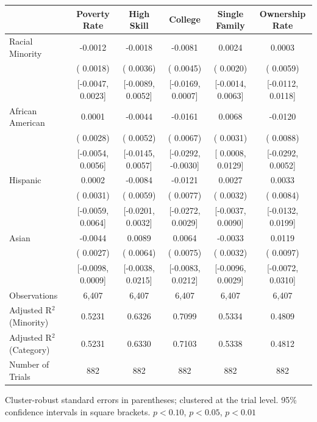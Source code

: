 \begin{table}[!htbp]
{\begin{tabular}{lccccc}
& Poverty Rate & High Skill & College & Single Family & Ownership Rate \\
\midrule
Racial Minority & -0.0012 & -0.0018 & -0.0081\sym{*} &  0.0024 &  0.0003  \\
 & ( 0.0018) & ( 0.0036) & ( 0.0045) & ( 0.0020) & ( 0.0059)  \\
 & [-0.0047,  0.0023] & [-0.0089,  0.0052] & [-0.0169,  0.0007] & [-0.0014,  0.0063] & [-0.0112,  0.0118]  \\
African American &  0.0001 & -0.0044 & -0.0161\sym{**} &  0.0068\sym{**} & -0.0120  \\
 & ( 0.0028) & ( 0.0052) & ( 0.0067) & ( 0.0031) & ( 0.0088)  \\
 & [-0.0054,  0.0056] & [-0.0145,  0.0057] & [-0.0292, -0.0030] & [ 0.0008,  0.0129] & [-0.0292,  0.0052]  \\
Hispanic &  0.0002 & -0.0084 & -0.0121 &  0.0027 &  0.0033  \\
 & ( 0.0031) & ( 0.0059) & ( 0.0077) & ( 0.0032) & ( 0.0084)  \\
 & [-0.0059,  0.0064] & [-0.0201,  0.0032] & [-0.0272,  0.0029] & [-0.0037,  0.0090] & [-0.0132,  0.0199]  \\
Asian & -0.0044 &  0.0089 &  0.0064 & -0.0033 &  0.0119  \\
 & ( 0.0027) & ( 0.0064) & ( 0.0075) & ( 0.0032) & ( 0.0097)  \\
 & [-0.0098,  0.0009] & [-0.0038,  0.0215] & [-0.0083,  0.0212] & [-0.0096,  0.0029] & [-0.0072,  0.0310]  \\
\midrule
Observations & 6{,}407 & 6{,}407 & 6{,}407 & 6{,}407 & 6{,}407\\
Adjusted R$^2$ (Minority) & 0.5231 & 0.6326 & 0.7099 & 0.5334 & 0.4809\\
Adjusted R$^2$ (Category) & 0.5231 & 0.6330 & 0.7103 & 0.5338 & 0.4812\\
Number of Trials & 882 & 882 & 882 & 882 & 882\\
\bottomrule
\end{tabular}
}
\begin{minipage}{\textwidth}
\footnotesize
Cluster-robust standard errors in parentheses; clustered at the trial level. 95\% confidence intervals in square brackets.
\sym{*} \(p<0.10\), \sym{**} \(p<0.05\), \sym{***} \(p<0.01\)
\end{minipage}
\end{table}

